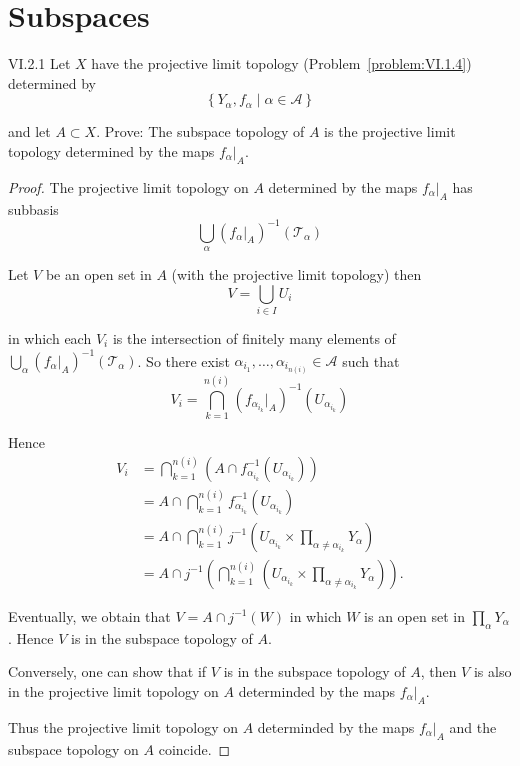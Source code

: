\section{Subspaces}

\begin{problem}{VI.2.1}
Let \(X\) have the projective limit topology (Problem~\ref{problem:VI.1.4}) determined by
\[
	\left\{ Y_{\alpha}, f_{\alpha} \mid \alpha \in \mathscr{A} \right\}
\]

and let \( A \subset X \). Prove: The subspace topology of \(A\) is the projective limit topology determined by the maps \( f_{\alpha}\vert_{A} \).
\end{problem}

\begin{proof}
	The projective limit topology on \( A \) determined by the maps \( f_{\alpha}\vert_{A} \) has subbasis
	\[
		\bigcup_{\alpha} {(f_{\alpha}\vert_{A})}^{-1}(\mathscr{T}_{\alpha})
	\]

	Let \( V \) be an open set in \( A \) (with the projective limit topology) then
	\[
		V = \bigcup_{i\in I} U_{i}
	\]

	in which each \( V_{i} \) is the intersection of finitely many elements of \( \bigcup_{\alpha} {(f_{\alpha}\vert_{A})}^{-1}(\mathscr{T}_{\alpha}) \). So there exist \( \alpha_{i_{1}}, \ldots, \alpha_{i_{n(i)}} \in \mathscr{A} \) such that
	\[
		V_{i} = \bigcap^{n(i)}_{k=1} {(f_{\alpha_{i_{k}}}\vert_{A})}^{-1}(U_{\alpha_{i_{k}}})
	\]

	Hence
	\begingroup
	\allowdisplaybreaks%
	\begin{align*}
		V_{i} & = \bigcap^{n(i)}_{k=1} (A \cap f_{\alpha_{i_{k}}}^{-1}(U_{\alpha_{i_{k}}}))                                                             \\
		      & = A \cap \bigcap^{n(i)}_{k=1} f_{\alpha_{i_{k}}}^{-1}(U_{\alpha_{i_{k}}})                                                               \\
		      & = A \cap \bigcap^{n(i)}_{k=1} j^{-1}\left( U_{\alpha_{i_{k}}} \times \prod_{\alpha \ne \alpha_{i_{k}}} Y_{\alpha} \right)               \\
		      & = A \cap j^{-1}\left( \bigcap^{n(i)}_{k=1} \left( U_{\alpha_{i_{k}}} \times \prod_{\alpha\ne\alpha_{i_{k}}} Y_{\alpha} \right) \right).
	\end{align*}
	\endgroup

	Eventually, we obtain that \( V = A \cap j^{-1}(W) \) in which \( W \) is an open set in \( \prod_{\alpha} Y_{\alpha} \). Hence \( V \) is in the subspace topology of \( A \).

	Conversely, one can show that if \( V \) is in the subspace topology of \( A \), then \( V \) is also in the projective limit topology on \( A \) determinded by the maps \( f_{\alpha}\vert_{A} \).

	Thus the projective limit topology on \( A \) determinded by the maps \( f_{\alpha}\vert_{A} \) and the subspace topology on \( A \) coincide.
\end{proof}

